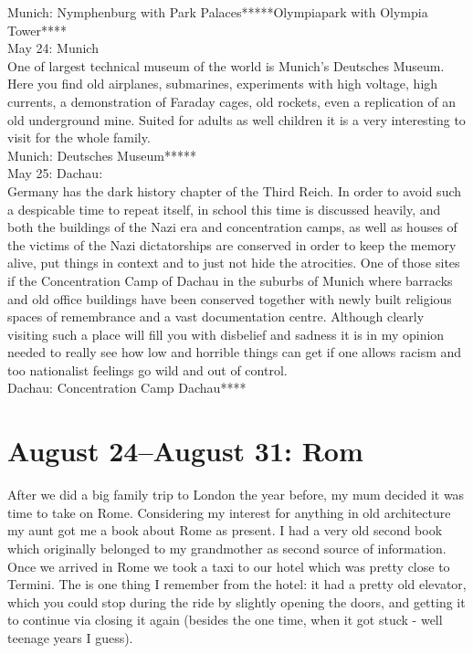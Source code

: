 Munich: Nymphenburg with Park Palaces*****Olympiapark with Olympia Tower****\\

May 24: Munich\\
One of largest technical museum of the world is Munich's Deutsches Museum. Here you find old airplanes, submarines, experiments with high voltage, high currents, a demonstration of Faraday cages, old rockets, even a replication of an old underground mine. Suited for adults as well children it is a very interesting to visit for the whole family.\\

Munich: Deutsches Museum*****\\

May 25: Dachau:\\
Germany has the dark history chapter of the Third Reich. In order to avoid such a despicable time to repeat itself, in school this time is discussed heavily, and both the buildings of the Nazi era and concentration camps, as well as houses of the victims of the Nazi dictatorships are conserved in order to keep the memory alive, put things in context and to just not hide the atrocities. One of those sites if the Concentration Camp of Dachau in the suburbs of Munich where barracks and old office buildings have been conserved together with newly built religious spaces of remembrance and a vast documentation centre. Although clearly visiting such a place will fill you with disbelief and sadness it is in my opinion needed to really see how low and horrible things can get if one allows racism and too nationalist feelings go wild and out of control.\\

Dachau: Concentration Camp Dachau**** 

\section{August 24--August 31: Rom}
\label{1997:Rom}

After we did a big family trip to London the year before, my mum decided it was time to take on Rome. Considering my interest for anything in old architecture my aunt got me a book about Rome as present. I had a very old second book which originally belonged to my grandmother as second source of information. Once we arrived in Rome we took a taxi to our hotel which was pretty close to Termini. The is one thing I remember from the hotel: it had a pretty old elevator, which you could stop during the ride by slightly opening the doors, and getting it to continue via closing it again (besides the one time, when it got stuck - well teenage years I guess). \\

